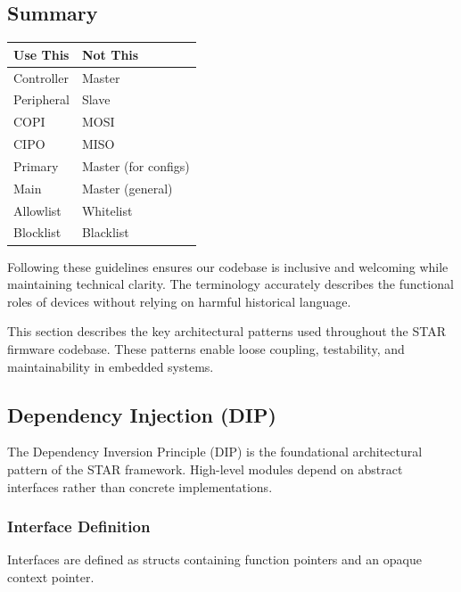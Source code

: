 \subsection{Summary}

\begin{center}
\begin{tabular}{|l|l|}
\hline
\textbf{Use This} & \textbf{Not This} \\
\hline
Controller & Master \\
\hline
Peripheral & Slave \\
\hline
COPI & MOSI \\
\hline
CIPO & MISO \\
\hline
Primary & Master (for configs) \\
\hline
Main & Master (general) \\
\hline
Allowlist & Whitelist \\
\hline
Blocklist & Blacklist \\
\hline
\end{tabular}
\end{center}

Following these guidelines ensures our codebase is inclusive and welcoming while maintaining technical clarity. The terminology accurately describes the functional roles of devices without relying on harmful historical language.



This section describes the key architectural patterns used throughout the STAR firmware codebase. These patterns enable loose coupling, testability, and maintainability in embedded systems.

\subsection{Dependency Injection (DIP)}

The Dependency Inversion Principle (DIP) is the foundational architectural pattern of the STAR framework. High-level modules depend on abstract interfaces rather than concrete implementations.

\subsubsection{Interface Definition}

Interfaces are defined as structs containing function pointers and an opaque context pointer.

